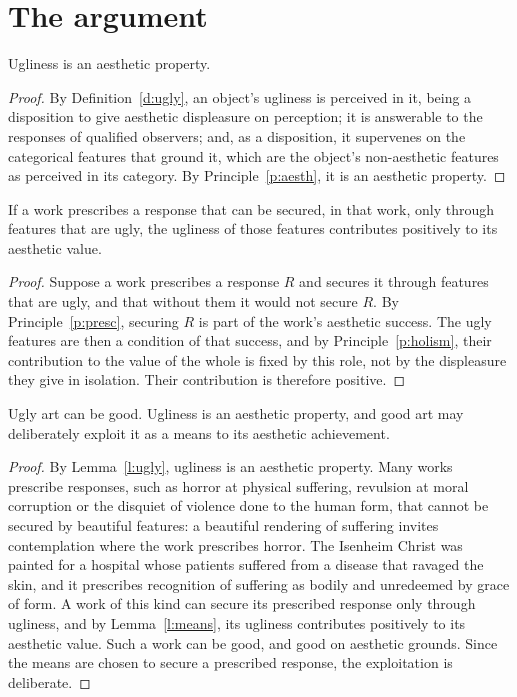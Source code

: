 \documentclass{situationist-preprint}
\begin{document}
\section{The argument}

\begin{lemma}\label{l:ugly}
Ugliness is an aesthetic property.
\end{lemma}

\begin{proof}
By Definition~\ref{d:ugly}, an object's ugliness is perceived in it, being a disposition to give aesthetic displeasure on perception; it is answerable to the responses of qualified observers; and, as a disposition, it supervenes on the categorical features that ground it, which are the object's non-aesthetic features as perceived in its category. By Principle~\ref{p:aesth}, it is an aesthetic property.
\end{proof}

\begin{lemma}\label{l:means}
If a work prescribes a response that can be secured, in that work, only through features that are ugly, the ugliness of those features contributes positively to its aesthetic value.
\end{lemma}

\begin{proof}
Suppose a work prescribes a response $R$ and secures it through features that are ugly, and that without them it would not secure $R$. By Principle~\ref{p:presc}, securing $R$ is part of the work's aesthetic success. The ugly features are then a condition of that success, and by Principle~\ref{p:holism}, their contribution to the value of the whole is fixed by this role, not by the displeasure they give in isolation. Their contribution is therefore positive.
\end{proof}

\begin{theorem}\label{t:main}
Ugly art can be good. Ugliness is an aesthetic property, and good art may deliberately exploit it as a means to its aesthetic achievement.
\end{theorem}

\begin{proof}
By Lemma~\ref{l:ugly}, ugliness is an aesthetic property. Many works prescribe responses, such as horror at physical suffering, revulsion at moral corruption or the disquiet of violence done to the human form, that cannot be secured by beautiful features: a beautiful rendering of suffering invites contemplation where the work prescribes horror. The Isenheim Christ was painted for a hospital whose patients suffered from a disease that ravaged the skin, and it prescribes recognition of suffering as bodily and unredeemed by grace of form. A work of this kind can secure its prescribed response only through ugliness, and by Lemma~\ref{l:means}, its ugliness contributes positively to its aesthetic value. Such a work can be good, and good on aesthetic grounds. Since the means are chosen to secure a prescribed response, the exploitation is deliberate.
\end{proof}
\end{document}
